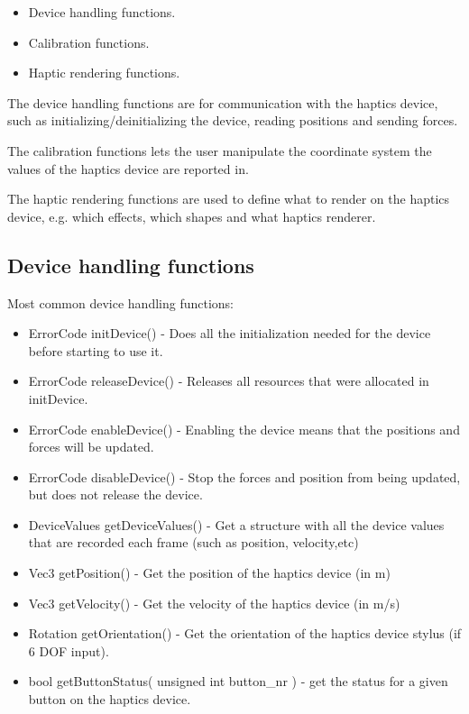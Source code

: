 \begin{itemize}
\item Device handling functions.
\item Calibration functions.
\item Haptic rendering functions.
\end{itemize}

The device handling functions are for communication with the haptics device, such as initializing/deinitializing the device, reading positions and sending forces. 

The calibration functions lets the user manipulate the coordinate system the values of the haptics device are reported in.

The haptic rendering functions are used to define what to render on the haptics device, e.g. which effects, which shapes and what haptics renderer.

\subsection{Device handling functions}

Most common device handling functions:

\begin{itemize}
\item ErrorCode initDevice() -  Does all the initialization needed for the
device before starting to use it.
\item ErrorCode releaseDevice() - Releases all resources that were allocated
in initDevice.
\item ErrorCode enableDevice() - Enabling the device means that the
positions and forces will be updated.  
\item ErrorCode disableDevice() - Stop the forces and position
from being updated, but does not release the device.
\item DeviceValues getDeviceValues() - Get a structure with all the
  device values that are recorded each frame (such as position,
  velocity,etc)
\item Vec3 getPosition() - Get the position of the haptics device (in
  m)
\item Vec3 getVelocity() - Get the velocity of the haptics device (in
  m/s)
\item Rotation getOrientation() - Get the orientation of the haptics
  device stylus (if 6 DOF input).
\item bool getButtonStatus( unsigned int button\_nr ) - get the status
  for a given button on the haptics device.
\end{itemize}

